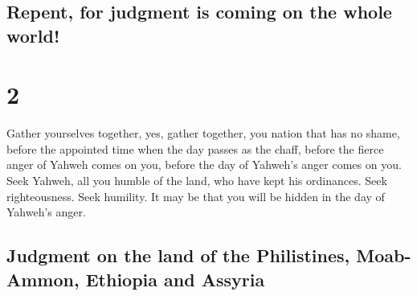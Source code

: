 \begin{paracol}{2}
\begin{otherlanguage}{english}
\hypertarget{repent-for-judgment-is-coming-on-the-whole-world}{%
\subsection{Repent, for judgment is coming on the whole
world!}\label{repent-for-judgment-is-coming-on-the-whole-world}}

\hypertarget{section-3}{%
\section{2}\label{section-3}}

 Gather yourselves together, yes, gather together, you
nation that has no shame,  before the appointed time when
the day passes as the chaff, before the fierce anger of Yahweh comes on
you, before the day of Yahweh's anger comes on you.  Seek
Yahweh, all you humble of the land, who have kept his ordinances. Seek
righteousness. Seek humility. It may be that you will be hidden in the
day of Yahweh's anger.

\hypertarget{judgment-on-the-land-of-the-philistines-moab-ammon-ethiopia-and-assyria}{%
\subsection{Judgment on the land of the Philistines, Moab-Ammon,
Ethiopia and
Assyria}\label{judgment-on-the-land-of-the-philistines-moab-ammon-ethiopia-and-assyria}}


\end{otherlanguage}
\end{paracol}

